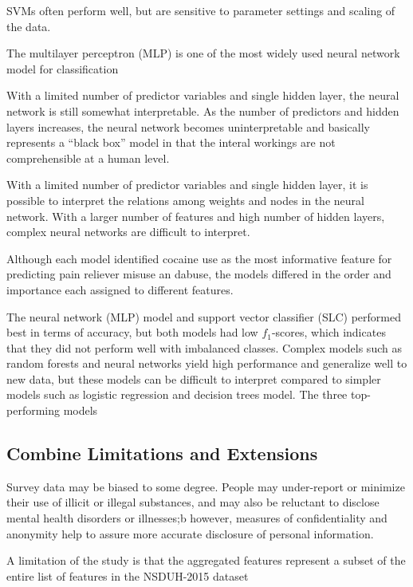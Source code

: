 \documentclass[sigconf]{acmart}
\begin{document}
SVMs often perform well, but are sensitive to parameter settings 
and scaling of the data. 

The multilayer perceptron (MLP) is one of the most widely used neural network 
model for classification 

With a limited number of predictor variables and single 
hidden layer, the neural network is still somewhat interpretable. As the 
number of predictors and hidden layers increases, the neural network becomes 
uninterpretable and basically represents a ``black box'' model in that 
the interal workings are not comprehensible at a human level. 

With a limited number of predictor variables and single hidden layer, 
it is possible to interpret the relations among weights
and nodes in the neural network. With a larger number of features and high
number of hidden layers, complex neural networks are difficult to interpret.

Although each model identified
cocaine use as the most informative feature for predicting pain reliever
misuse an dabuse, the models differed in the order and importance each 
assigned to different features.


The neural network (MLP) model and support vector classifier (SLC) 
performed best in terms of accuracy, but both models had low $f_1$-scores, 
which indicates that they did not perform well with imbalanced classes. 
Complex models such as random forests and neural networks yield high 
performance and generalize well to new data, but these models can be difficult 
to interpret compared to simpler models such as logistic regression and decision 
trees model. The three top-performing models 



\subsection{Combine Limitations and Extensions}

Survey data may be biased to some degree. People may under-report or minimize 
their use of illicit or illegal substances, and may also be reluctant to 
disclose mental health disorders or illnesses;b however, measures of 
confidentiality and anonymity help to assure more accurate disclosure 
of personal information. 

A limitation of the study is that the aggregated features represent a subset
of the entire list of features in the NSDUH-2015 dataset 
\end{document}
